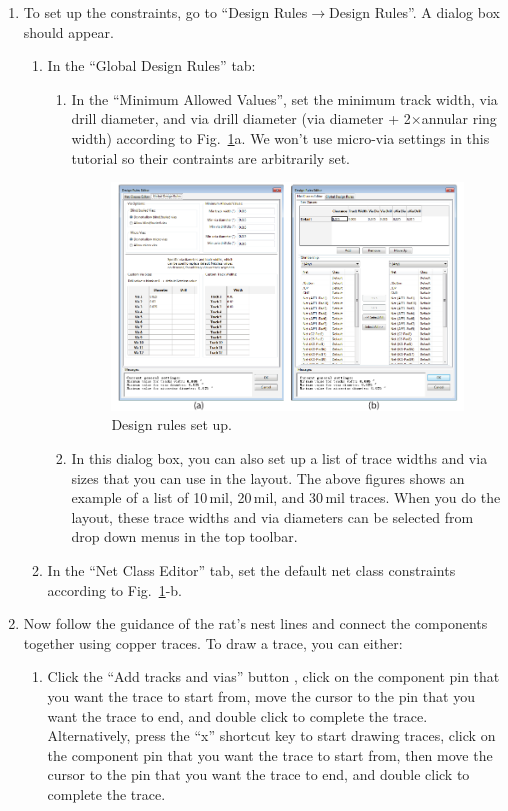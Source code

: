 \documentclass[12pt,letterpaper]{scrartcl}
\begin{document}
\begin{enumerate}
	\item To set up the constraints, go to ``Design Rules$\rightarrow$Design Rules''. A dialog box should appear. 
	\begin{enumerate}
		\item In the ``Global Design Rules'' tab:
			\begin{enumerate}
				\item 	In the ``Minimum Allowed Values'', set the minimum track width, via drill diameter, and via drill diameter (via diameter + 2$\times$annular ring width) according to  Fig.~\ref{fig:design-rules}a. We won't use micro-via settings in this tutorial so their contraints are arbitrarily set.
				\begin{figure}[h]
					\centering
					\includegraphics[width=5.5in]{design-rules}
					\caption{Design rules set up.}
					\label{fig:design-rules}
				\end{figure}
				
				\item In this dialog box, you can also set up a list of trace widths and via sizes that you can use in the layout. The above figures shows an example of a list of 10\,mil, 20\,mil, and 30\,mil traces. When you do the layout, these trace widths and via diameters can be selected from drop down menus in the top toolbar.					
			\end{enumerate}
		\item In the ``Net Class Editor'' tab, set the default net class constraints according to Fig.~\ref{fig:design-rules}-b. 	
	\end{enumerate}

	\item Now follow the guidance of the rat's nest lines and connect the components together using copper traces. To draw a trace, you can either:
		\begin{enumerate}
			\item Click the ``Add tracks and vias'' button , click on the component pin that you want the trace to start from, move the cursor to the pin that you want the trace to end, and double click to complete the trace. Alternatively, press the ``x'' shortcut key to start drawing traces, click on the component pin that you want the trace to start from, then move the cursor to the pin that you want the trace to end, and double click to complete the trace.
			

\end{enumerate}
\end{enumerate}
\end{document}

